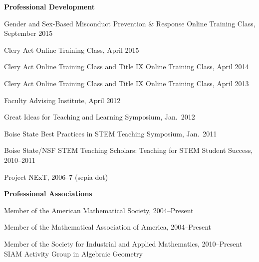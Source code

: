 \documentclass[12pt]{article}
\begin{document}
\textbf{Professional Development}
\begin{description}
\setlength{}
\item[] Gender and Sex-Based Misconduct Prevention \& Response Online Training Class, September 2015
\item[] Clery Act Online Training Class, April 2015
\item[] Clery Act Online Training Class and Title IX Online Training Class, April 2014
\item[] Clery Act Online Training Class and Title IX Online Training Class, April 2013
\item[] Faculty Advising Institute, April 2012
\item[] Great Ideas for Teaching and Learning Symposium, Jan.\ 2012
\item[] Boise State Best Practices in STEM Teaching Symposium, Jan.\ 2011
\item[] Boise State/NSF STEM Teaching Scholars: Teaching for STEM Student Success, 2010--2011
\item[] Project NExT, 2006--7 (sepia dot)%
\end{description}




\textbf{Professional Associations}
\begin{description}
\setlength{}
\item[] Member of the American Mathematical Society, 2004--Present
\item[] Member of the Mathematical Association of America, 2004--Present
\item[] Member of the Society for Industrial and Applied Mathematics, 2010--Present \\ SIAM Activity Group in Algebraic Geometry
\end{description}


\end{document}
